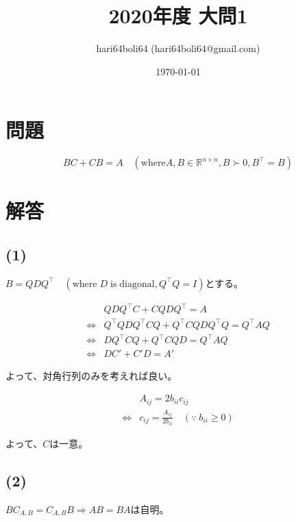 \documentclass[a4paper, 10pt, dvipdfmx]{jlreq}
\begin{document}
\title{2020年度 大問1}
\author{hari64boli64 (hari64boli64@gmail.com)}
\date{\today}
\maketitle


\section{問題}

\begin{equation*}
  BC+CB=A \quad (\mathrm{where} A,B \in \mathbb{R}^{n\times n}, B\succ 0, B^\top =B)
\end{equation*}

\section{解答}

\subsection*{(1)}

$B=QDQ^\top  \quad (\mathrm{where} \; D \; \mathrm{is}\; \mathrm{diagonal}, Q^\top Q=I)$とする。

\begin{align*}
                  & QDQ^\top C+CQDQ^\top =A                         \\
  \Leftrightarrow & Q^\top QDQ^\top CQ+Q^\top CQDQ^\top Q=Q^\top AQ \\
  \Leftrightarrow & DQ^\top CQ+Q^\top CQD=Q^\top AQ                 \\
  \Leftrightarrow & DC'+C'D=A'
\end{align*}

よって、対角行列のみを考えれば良い。

\begin{align*}
                  & A_{ij}=2b_{ii}c_{ij}                                           \\
  \Leftrightarrow & c_{ij}=\frac{A_{ij}}{2b_{ii}}\quad (\because \; b_{ii} \geq 0)
\end{align*}

よって、$C$は一意。

\subsection*{(2)}

$BC_{A,B}=C_{A,B}B \Rightarrow AB=BA$は自明。
\end{document}

